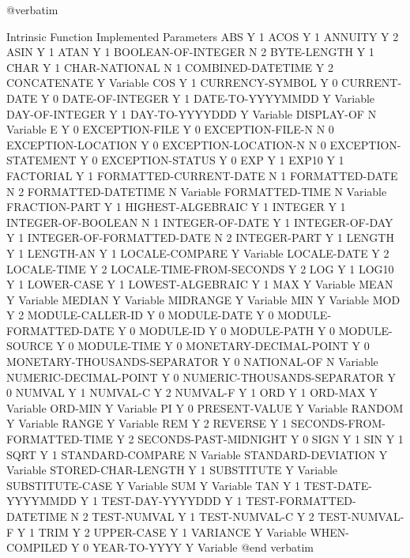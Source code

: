 @verbatim

Intrinsic Function		Implemented	Parameters
ABS				Y		1
ACOS				Y		1
ANNUITY				Y		2
ASIN				Y		1
ATAN				Y		1
BOOLEAN-OF-INTEGER		N		2
BYTE-LENGTH			Y		1
CHAR				Y		1
CHAR-NATIONAL			N		1
COMBINED-DATETIME		Y		2
CONCATENATE			Y		Variable
COS				Y		1
CURRENCY-SYMBOL			Y		0
CURRENT-DATE			Y		0
DATE-OF-INTEGER			Y		1
DATE-TO-YYYYMMDD		Y		Variable
DAY-OF-INTEGER			Y		1
DAY-TO-YYYYDDD			Y		Variable
DISPLAY-OF			N		Variable
E				Y		0
EXCEPTION-FILE			Y		0
EXCEPTION-FILE-N		N		0
EXCEPTION-LOCATION		Y		0
EXCEPTION-LOCATION-N		N		0
EXCEPTION-STATEMENT		Y		0
EXCEPTION-STATUS		Y		0
EXP				Y		1
EXP10				Y		1
FACTORIAL			Y		1
FORMATTED-CURRENT-DATE		N		1
FORMATTED-DATE			N		2
FORMATTED-DATETIME		N		Variable
FORMATTED-TIME			N		Variable
FRACTION-PART			Y		1
HIGHEST-ALGEBRAIC		Y		1
INTEGER				Y		1
INTEGER-OF-BOOLEAN		N		1
INTEGER-OF-DATE			Y		1
INTEGER-OF-DAY			Y		1
INTEGER-OF-FORMATTED-DATE	N		2
INTEGER-PART			Y		1
LENGTH				Y		1
LENGTH-AN			Y		1
LOCALE-COMPARE			Y		Variable
LOCALE-DATE			Y		2
LOCALE-TIME			Y		2
LOCALE-TIME-FROM-SECONDS	Y		2
LOG				Y		1
LOG10				Y		1
LOWER-CASE			Y		1
LOWEST-ALGEBRAIC		Y		1
MAX				Y		Variable
MEAN				Y		Variable
MEDIAN				Y		Variable
MIDRANGE			Y		Variable
MIN				Y		Variable
MOD				Y		2
MODULE-CALLER-ID		Y		0
MODULE-DATE			Y		0
MODULE-FORMATTED-DATE		Y		0
MODULE-ID			Y		0
MODULE-PATH			Y		0
MODULE-SOURCE			Y		0
MODULE-TIME			Y		0
MONETARY-DECIMAL-POINT		Y		0
MONETARY-THOUSANDS-SEPARATOR	Y		0
NATIONAL-OF			N		Variable
NUMERIC-DECIMAL-POINT		Y		0
NUMERIC-THOUSANDS-SEPARATOR	Y		0
NUMVAL				Y		1
NUMVAL-C			Y		2
NUMVAL-F			Y		1
ORD				Y		1
ORD-MAX				Y		Variable
ORD-MIN				Y		Variable
PI				Y		0
PRESENT-VALUE			Y		Variable
RANDOM				Y		Variable
RANGE				Y		Variable
REM				Y		2
REVERSE				Y		1
SECONDS-FROM-FORMATTED-TIME	Y		2
SECONDS-PAST-MIDNIGHT		Y		0
SIGN				Y		1
SIN				Y		1
SQRT				Y		1
STANDARD-COMPARE		N		Variable
STANDARD-DEVIATION		Y		Variable
STORED-CHAR-LENGTH		Y		1
SUBSTITUTE			Y		Variable
SUBSTITUTE-CASE			Y		Variable
SUM				Y		Variable
TAN				Y		1
TEST-DATE-YYYYMMDD		Y		1
TEST-DAY-YYYYDDD		Y		1
TEST-FORMATTED-DATETIME		N		2
TEST-NUMVAL			Y		1
TEST-NUMVAL-C			Y		2
TEST-NUMVAL-F			Y		1
TRIM				Y		2
UPPER-CASE			Y		1
VARIANCE			Y		Variable
WHEN-COMPILED			Y		0
YEAR-TO-YYYY			Y		Variable
@end verbatim

